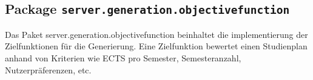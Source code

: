 \FloatBarrier
\subsection[Package server.generation.objectivefunction]{Package \texttt{server.generation.objectivefunction}}
Das Paket server.generation.objectivefunction beinhaltet die implementierung der Zielfunktionen für die Generierung.
Eine Zielfunktion bewertet einen Studienplan anhand von Kriterien wie ECTS pro Semester, Semesteranzahl, Nutzerpräferenzen, etc.
       